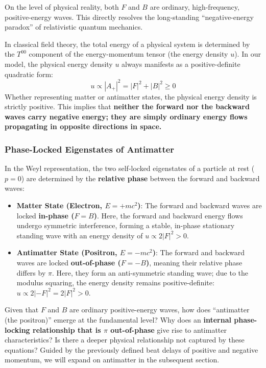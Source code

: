 \documentclass[12pt, a4paper]{article}
\begin{document}
On the level of physical reality, both $F$ and $B$ are ordinary, high-frequency, positive-energy waves. This directly resolves the long-standing ``negative-energy paradox'' of relativistic quantum mechanics.

In classical field theory, the total energy of a physical system is determined by the $T^{00}$ component of the energy-momentum tensor (the energy density $u$). In our model, the physical energy density $u$ always manifests as a positive-definite quadratic form:
\begin{equation}
    u \propto |A_+|^2 = |F|^2 + |B|^2 \ge 0
\end{equation}
Whether representing matter or antimatter states, the physical energy density is strictly positive. This implies that \textbf{neither the forward nor the backward waves carry negative energy; they are simply ordinary energy flows propagating in opposite directions in space.}

\subsubsection{Phase-Locked Eigenstates of Antimatter}

In the Weyl representation, the two self-locked eigenstates of a particle at rest ($p=0$) are determined by the \textbf{relative phase} between the forward and backward waves:
\begin{itemize}
    \item \textbf{Matter State (Electron, $E = +mc^2$)}: The forward and backward waves are locked \textbf{in-phase ($F = B$)}. Here, the forward and backward energy flows undergo symmetric interference, forming a stable, in-phase stationary standing wave with an energy density of $u \propto 2|F|^2 > 0$.
    \item \textbf{Antimatter State (Positron, $E = -mc^2$)}: The forward and backward waves are locked \textbf{out-of-phase ($F = -B$)}, meaning their relative phase differs by $\pi$. Here, they form an anti-symmetric standing wave; due to the modulus squaring, the energy density remains positive-definite: $u \propto 2|-F|^2 = 2|F|^2 > 0$.
\end{itemize}

Given that $F$ and $B$ are ordinary positive-energy waves, how does ``antimatter (the positron)'' emerge at the fundamental level? Why does an \textbf{internal phase-locking relationship that is $\pi$ out-of-phase} give rise to antimatter characteristics? Is there a deeper physical relationship not captured by these equations? Guided by the previously defined beat delays of positive and negative momentum, we will expand on antimatter in the subsequent section.
\end{document}

